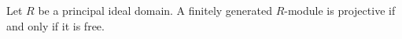 Let $R$ be a principal ideal domain. A finitely generated $R$-module is projective if and only if it is free.
